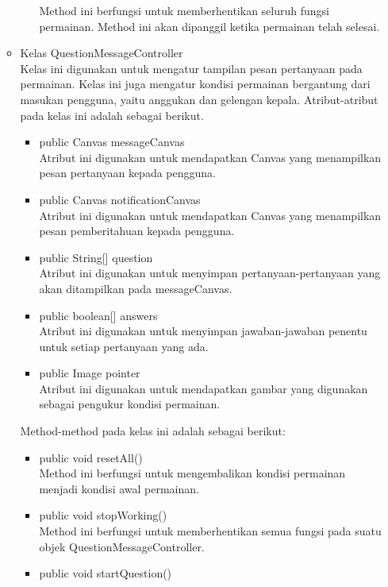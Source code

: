 \begin{itemize}
\begin{itemize}
\begin{itemize}
            Method ini berfungsi untuk memberhentikan seluruh fungsi permainan. Method ini akan dipanggil ketika permainan telah selesai.
        \end{itemize}
        \item Kelas QuestionMessageController\\
        Kelas ini digunakan untuk mengatur tampilan pesan pertanyaan pada permainan. Kelas ini juga mengatur kondisi permainan bergantung dari masukan pengguna, yaitu anggukan dan gelengan kepala.
        Atribut-atribut pada kelas ini adalah sebagai berikut.
        \begin{itemize}
            \item public Canvas messageCanvas\\
            Atribut ini digunakan untuk mendapatkan Canvas yang menampilkan pesan pertanyaan kepada pengguna.
            \item public Canvas notificationCanvas\\
            Atribut ini digunakan untuk mendapatkan Canvas yang menampilkan pesan pemberitahuan kepada pengguna.
            \item public String[] question\\
            Atribut ini digunakan untuk menyimpan pertanyaan-pertanyaan yang akan ditampilkan pada messageCanvas.
            \item public boolean[] answers\\
            Atribut ini digunakan untuk menyimpan jawaban-jawaban penentu untuk setiap pertanyaan yang ada.
            \item public Image pointer\\
            Atribut ini digunakan untuk mendapatkan gambar yang digunakan sebagai pengukur kondisi permainan.
        \end{itemize}
        Method-method pada kelas ini adalah sebagai berikut:
        \begin{itemize}
            \item public void resetAll()\\
            Method ini berfungsi untuk mengembalikan kondisi permainan menjadi kondisi awal permainan.
            \item public void stopWorking()\\
            Method ini berfungsi untuk memberhentikan semua fungsi pada suatu objek QuestionMessageController.
            \item public void startQuestion()\\

\end{itemize}
\end{itemize}
\end{itemize}
